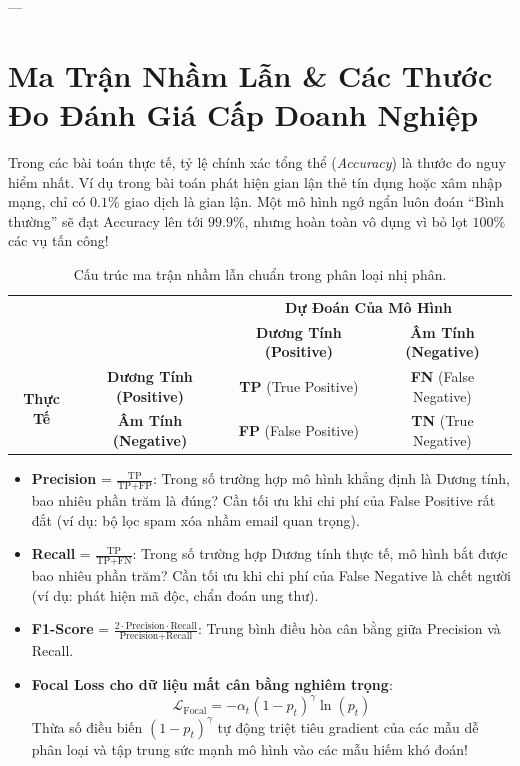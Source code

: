 ---

\section{Ma Trận Nhầm Lẫn \& Các Thước Đo Đánh Giá Cấp Doanh Nghiệp}
\label{sec:evaluation-metrics}

Trong các bài toán thực tế, tỷ lệ chính xác tổng thể (\textit{Accuracy}) là thước đo nguy hiểm nhất. Ví dụ trong bài toán phát hiện gian lận thẻ tín dụng hoặc xâm nhập mạng, chỉ có $0.1\%$ giao dịch là gian lận. Một mô hình ngớ ngẩn luôn đoán ``Bình thường'' sẽ đạt Accuracy lên tới $99.9\%$, nhưng hoàn toàn vô dụng vì bỏ lọt $100\%$ các vụ tấn công!

\begin{table}[htbp]
\centering
\small
\setlength{\tabcolsep}{8pt}
\begin{tabular}{cc|cc}
\multicolumn{2}{c}{} & \multicolumn{2}{c}{\textbf{Dự Đoán Của Mô Hình}} \\
\multicolumn{2}{c|}{} & \textbf{Dương Tính (Positive)} & \textbf{Âm Tính (Negative)} \\
\hline
\multirow{2}{*}{\textbf{Thực Tế}} & \textbf{Dương Tính (Positive)} & \textbf{TP} (True Positive) & \textbf{FN} (False Negative) \\
& \textbf{Âm Tính (Negative)} & \textbf{FP} (False Positive) & \textbf{TN} (True Negative) \\
\end{tabular}
\caption{Cấu trúc ma trận nhầm lẫn chuẩn trong phân loại nhị phân.}
\label{tbl:confusion-matrix-layout}
\end{table}

\begin{itemize}
  \item \textbf{Precision} = $\frac{\text{TP}}{\text{TP} + \text{FP}}$: Trong số trường hợp mô hình khẳng định là Dương tính, bao nhiêu phần trăm là đúng? Cần tối ưu khi chi phí của False Positive rất đắt (ví dụ: bộ lọc spam xóa nhầm email quan trọng).
  \item \textbf{Recall} = $\frac{\text{TP}}{\text{TP} + \text{FN}}$: Trong số trường hợp Dương tính thực tế, mô hình bắt được bao nhiêu phần trăm? Cần tối ưu khi chi phí của False Negative là chết người (ví dụ: phát hiện mã độc, chẩn đoán ung thư).
  \item \textbf{F1-Score} = $\frac{2 \cdot \text{Precision} \cdot \text{Recall}}{\text{Precision} + \text{Recall}}$: Trung bình điều hòa cân bằng giữa Precision và Recall.
  \item \textbf{Focal Loss cho dữ liệu mất cân bằng nghiêm trọng}:
  \begin{equation}
  \mathcal{L}_{\text{Focal}} = -\alpha_t (1 - p_t)^\gamma \ln(p_t)
  \end{equation}
  Thừa số điều biến $(1 - p_t)^\gamma$ tự động triệt tiêu gradient của các mẫu dễ phân loại và tập trung sức mạnh mô hình vào các mẫu hiếm khó đoán!
\end{itemize}

